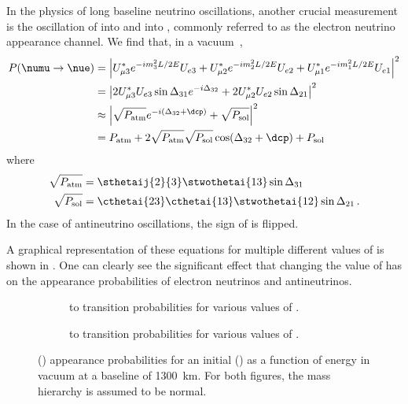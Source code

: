 In the physics of long baseline neutrino oscillations, another crucial measurement is the oscillation of \numu into \nue and \anumu into \anue, commonly referred to as the electron neutrino appearance channel.
We find that, in a vacuum~\cite{Nunokawa_2008},
\begin{align}
\begin{split}
  P(\numu \rightarrow \nue) &= \left| U^{*}_{\mu 3} e^{-im_{3}^{2}L/2E} U_{e3} + U^{*}_{\mu 2} e^{-im_{2}^{2}L/2E} U_{e2} + U^{*}_{\mu 1}e^{-im_{1}^{2}L/2E}U_{e1} \right|^{2} \\
  &= \left| 2U_{\mu 3}^{*}U_{e3} \sin \Delta_{31} e^{-i \Delta_{32}} + 2U^{*}_{\mu 2}U_{e2} \sin \Delta_{21} \right|^{2} \\
  & \approx \left| \sqrt{P_{\text{atm}}} e^{-i(\Delta_{32}+\dcp)} + \sqrt{P_{\text{sol}}} \right|^{2} \\
  &= P_{\text{atm}} + 2 \sqrt{P_{\text{atm}}} \sqrt{P_{\text{sol}}} \cos(\Delta_{32}+\dcp) + P_{\text{sol}}
  \label{eq:threeNuApp}
\end{split}
\end{align}
where
\begin{align}
  \sqrt{P_{\text{atm}}} &= \sthetaij{2}{3} \stwothetai{13} \sin\Delta_{31} \\
  \sqrt{P_{\text{sol}}} &= \cthetai{23} \cthetai{13} \stwothetai{12} \sin\Delta_{21} \, .
\end{align}
In the case of antineutrino oscillations, the sign of \dcp is flipped.

A graphical representation of these equations for multiple different values of \dcp is shown in .
One can clearly see the significant effect that changing the value of \dcp has on the appearance probabilities of electron neutrinos and antineutrinos.

\begin{figure}[h]
  \centering
  \begin{subfigure}[t]{0.49\textwidth}
    \begin{adjustbox}{max totalsize={\textwidth}, center}
      
    \end{adjustbox}
    \caption{\numu to \nue transition probabilities for various values of \dcp.}
  \end{subfigure}
  \hfill
  \begin{subfigure}[t]{0.49\textwidth}
    \begin{adjustbox}{max totalsize={\textwidth}, center}
      
    \end{adjustbox}
    \caption{\anumu to \anue transition probabilities for various values of \dcp.}
  \end{subfigure}
  \caption[\nue and \anue appearance probabilities in vacuum.]{\nue(\anue) appearance probabilities for an initial \numu(\anumu) as a function of energy in vacuum at a baseline of 1300~km. For both figures, the mass hierarchy is assumed to be normal.}
  \label{fig:threeNuApp}
\end{figure}

